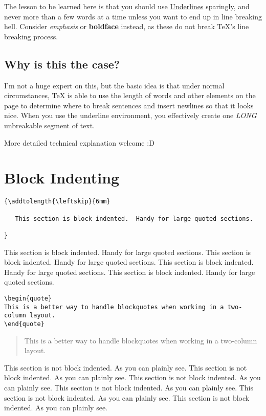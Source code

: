 \documentclass[11pt]{article}
\begin{document}
The lesson to be learned here is that you should use \underline{Underlines} sparingly, and never more than a few words at a time unless you want to end up in line breaking hell. Consider \emph{emphasis} or \textbf{boldface} instead, as these do not break TeX's line breaking process.

\subsection{Why is this the case?}

I'm not a huge expert on this, but the basic idea is that under normal circumstances, TeX is able to use the length of words and other elements on the page to determine where to break sentences and insert newlines so that it looks nice.  When you use the underline environment, you effectively create one \emph{LONG} unbreakable segment of text.

More detailed technical explanation welcome :D

\section{Block Indenting}

\begin{verbatim}
{\addtolength{\leftskip}{6mm}

   This section is block indented.  Handy for large quoted sections.

}
\end{verbatim}

{\addtolength{\leftskip}{6mm}

   This section is block indented.  Handy for large quoted sections.
   This section is block indented.  Handy for large quoted sections.
   This section is block indented.  Handy for large quoted sections.
   This section is block indented.  Handy for large quoted sections.

}

\begin{verbatim}
\begin{quote}
This is a better way to handle blockquotes when working in a two-column layout.
\end{quote}
\end{verbatim}

\begin{quote}
This is a better way to handle blockquotes when working in a two-column layout.
\end{quote}

\vspace{12pt}
This section is not block indented.  As you can plainly see.
This section is not block indented.  As you can plainly see.
This section is not block indented.  As you can plainly see.
This section is not block indented.  As you can plainly see.
This section is not block indented.  As you can plainly see.
This section is not block indented.  As you can plainly see.
\end{document}
